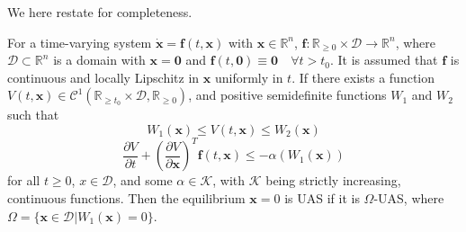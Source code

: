 \documentclass[../main.tex]{subfiles}
\begin{document}
We here restate \cite[Theorem 2]{Wang2008} for completeness.
\begin{theorem}
    \label{thm:omega_uas}
    For a time-varying  system $\dot{\bm{x}} = \bm{f}(t,\bm{x})$ with $\bm{x} \in \mathbb{R}^n$, $\bm{f} : \mathbb{R}_{\geq0} \times \mathcal{D} \rightarrow \mathbb{R}^n$, where $\mathcal{D} \subset \mathbb{R}^n$ is a domain with $\bm{x} = \bm{0}$ and $\bm{f}(t, \bm{0}) \equiv \bm{0} \quad \forall t > t_0$. It is assumed that $\bm{f}$ is continuous and locally Lipschitz in $\bm{x}$ uniformly in $t$. If there exists a function $V(t,\bm{x}) \in \mathcal{C}^1(\mathbb{R}_{\geq t_0} \times \mathcal{D}, \mathbb{R}_{\geq 0})$, and positive semidefinite functions $W_1$ and $W_2$ such that
    \begin{equation}
        \label{eq:omega_uas_1}
        W_1(\bm{x}) \leq V(t,\bm{x}) \leq W_2(\bm{x})
    \end{equation}
    \begin{equation}
        \label{eq:omega_uas_2}
        \frac{\partial V}{\partial t} + \left( \frac{\partial V }{\partial \bm{x}}\right)^T \bm{f}(t,\bm{x}) \leq -\alpha(W_1(\bm{x}))
    \end{equation}
    for  all $t\geq 0$, $x \in \mathcal{D}$, and some $\alpha \in \mathcal{K}$, with $\mathcal{K}$ being strictly increasing, continuous functions. Then the equilibrium  $\bm{x} = 0$ is UAS if it is $\Omega$-UAS, where $\Omega = \{\bm{x} \in \mathcal{D} | W_1(\bm{x}) = 0\}$.
\end{theorem}

\ifSubfilesClassLoaded{%
  
  
}{}
\end{document}
